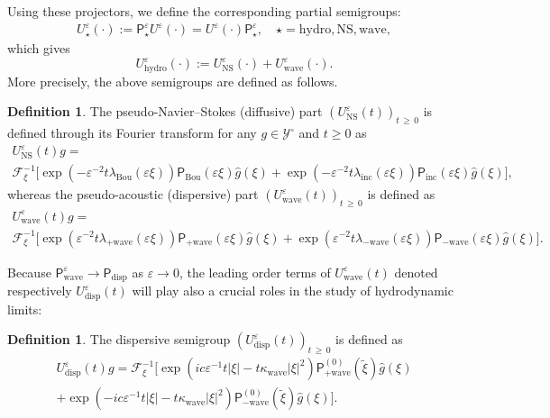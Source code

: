 \documentclass[10pt]{amsart}
\theoremstyle{definition}\newtheorem{defi}[theo]{Definition}\newtheorem{rema}[theo]{Remark}\newtheorem{exam}[theo]{Example}\newtheorem{exem}[theo]{Example}\newtheorem{nota}[theo]{Notation}
\newcommand{\ns}{\mathrm{NS}}
\newcommand{\hyd}{\mathrm{hydro}}
\newcommand{\Wave}{\mathrm{wave}}
\newcommand{\disp}{\mathrm{disp}}
\newcommand{\Inc}{\mathrm{inc}}
\newcommand{\Bou}{\mathrm{Bou}}
\newcommand{\FF}{\mathcal{F}}
\newcommand{\PP}{\mathsf{P}}
\newcommand{\VV}{\mathcal{Y}}
\newcommand{\SSgm}{\VV^{\circ}}
\renewcommand*\ge{\geqslant}
\newcommand*\eps{{\varepsilon}}
\begin{document}
Using these projectors, we define the corresponding partial semigroups:
\begin{gather*}
U^\eps_\star(\cdot):= \PP^\eps_\star U^\eps(\cdot) = U^\eps (\cdot)\PP^\eps_\star, \quad \star = \hyd, \ns, \Wave,
\end{gather*}
which gives
\begin{equation*}
U^\eps_\hyd(\cdot) := U^\eps_\ns(\cdot) + U^\eps_\Wave(\cdot).
\end{equation*}
More precisely, the above semigroups are defined as follows.
\begin{defi}\label{def:hydro_semigroups}
The pseudo-Navier--Stokes (diffusive) part $(U^\eps_\ns(t))_{t\,\ge\,0}$ is defined through its Fourier transform for any $g \in \SSgm$ and $t \ge 0$ as
\begin{multline}\label{eq:Unst}
U^\eps_\ns(t) g =\\
\FF_\xi^{-1} \Big[ \exp\left(- \eps^{-2} t \lambda_\Bou(\eps \xi) \right) \PP_\Bou(\eps \xi)\widehat{g}(\xi) 
 + \exp\left(- \eps^{-2} t \lambda_\Inc(\eps \xi) \right) \PP_\Inc(\eps \xi)\widehat{g}(\xi)\Big],
\end{multline}
whereas the pseudo-acoustic (dispersive) part $\left(U^\eps_\Wave(t)\right)_{t\,\ge\,0}$ is defined as
\begin{multline}\label{eq:UWave}
U^\eps_\Wave(t) g =\\
 \FF_\xi^{-1} \Big[ \exp\left(\eps^{-2} t \lambda_{+ \Wave}(\eps \xi) \right) \PP_{+ \Wave}(\eps \xi)\widehat{g}(\xi)
+ \exp\left(\eps^{-2} t \lambda_{- \Wave}(\eps \xi) \right) \PP_{- \Wave}(\eps \xi)\widehat{g}(\xi)\Big].
\end{multline}
\end{defi}

Because $\PP_\Wave^\eps \to \PP_\disp$ as $\eps \to 0$, the leading order terms of $U^\eps_\Wave(t)$ denoted respectively $U^\eps_\disp(t)$ will play also a crucial roles in the study of hydrodynamic limits:
\begin{defi}
The dispersive semigroup $(U^\eps_\disp(t))_{t\,\ge\,0}$ is defined as
\begin{multline*}
U^\eps_\disp(t)g =
\FF_\xi^{-1} \Big[ \exp\left(i c \eps^{-1} t|\xi| - t \kappa_\Wave | \xi |^2 \right) \PP^{(0)}_{+ \Wave}\left(\widetilde{\xi} \right) \widehat{g}(\xi)\\
+ \exp\left(- i c \eps^{-1} t|\xi| - t \kappa_\Wave | \xi |^2 \right) \PP^{(0)}_{- \Wave}\left(\widetilde{\xi} \right) \widehat{g}(\xi) \Big].
\end{multline*}
\end{defi}
\end{document}

